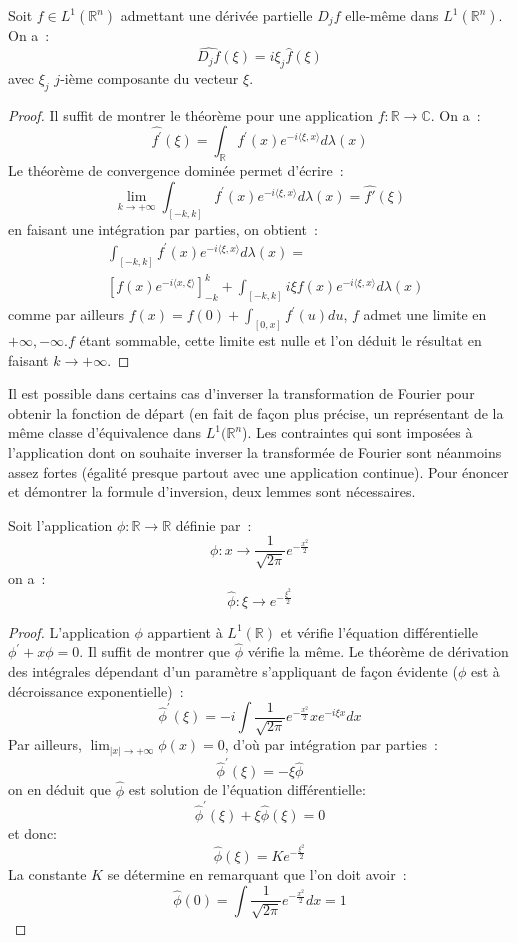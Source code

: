\begin{mandatory}
\begin{prop}
Soit $f \in L^1(\mathbb{R}^n)$ admettant une dérivée partielle $D_j f$
elle-même dans $ L^1(\mathbb{R}^n)$. On a~:
\[
\widehat{D_j f}(\xi) =  i \xi_j \widehat{f}(\xi)
\]
avec $\xi_j$ $j$-ième composante du vecteur $\xi$.
\end{prop}
\end{mandatory}
\begin{proof}
Il suffit de montrer le théorème pour une application $f : \mathbb{R}
\to \mathbb{C}$.
On a~:
\[
\widehat{f^\prime}(\xi) = \int_{\mathbb{R}} f^\prime (x) e^{-i \langle \xi,
  x \rangle } d \lambda(x)
\]
Le théorème de convergence dominée permet d'écrire~:
\[
\lim_{k \to + \infty} \int_{[-k,k]} f^\prime (x) e^{-i \langle \xi,
  x \rangle} d \lambda(x) = \widehat{f\prime}(\xi)
\]
en faisant une intégration par parties, on obtient~:
\begin{align*}
& \int_{[-k,k]} f^\prime(x) e^{-i \langle \xi,
  x \rangle } d \lambda(x) = \\
&[f(x) e^{-i \langle
  x, \xi \rangle }]_{-k}^k +  \int_{[-k,k]} i \xi f(x) e^{-i \langle\xi,
  x \rangle } d \lambda(x)
\end{align*}
comme par ailleurs $f(x) = f(0) +\int_{[0,x]} f^\prime(u) du$, $f$
admet une limite en $+\infty, -\infty$.$f$ étant sommable, cette
limite est nulle et l'on déduit le résultat en faisant $k \to +\infty$.
\end{proof}
Il est possible dans certains cas d'inverser la transformation de Fourier pour
obtenir la fonction de départ (en fait de façon plus précise, un représentant
de la même classe d'équivalence dans $L^1(\mathbb{R}^n$). Les contraintes qui
sont imposées à l'application dont on souhaite inverser la transformée de
Fourier sont néanmoins assez fortes (égalité presque partout avec une
application continue). Pour énoncer et démontrer la formule d'inversion, deux
lemmes sont nécessaires.
\begin{lemme}\label{fourier:3}
Soit l'application $\phi \colon \mathbb{R} \to \mathbb{R}$ définie par~:
\[
\phi : x \to \frac{1}{\sqrt{2\pi}}e^{-\frac{x^2}{2}}
\]
on a~:
\[
\widehat{\phi} : \xi \to e^{- \frac{\xi^2}{2}}
\]
\end{lemme}
\begin{proof}
L'application $\phi$ appartient à $L^1(\mathbb{R})$ et vérifie l'équation
différentielle $\phi^\prime + x \phi = 0$. Il suffit de montrer que $\widehat{\phi}$ vérifie la même.
Le théorème de dérivation des intégrales dépendant d'un paramètre
s'appliquant de façon évidente ($\phi$ est à décroissance
exponentielle)~:
\[
\widehat{\phi}^\prime(\xi) = -i \int
\frac{1}{\sqrt{2\pi}}e^{-\frac{x^2}{2}} x e^{-i \xi x} dx
\]
Par ailleurs, $\lim_{|x| \to +\infty} \phi(x) = 0$, d'où par intégration
par parties~:
\[
\widehat{\phi}^\prime(\xi) = - \xi \widehat{\phi}
\]
on en déduit que $\widehat{\phi}$ est solution de l'équation différentielle:
$$\widehat{\phi}^\prime(\xi)+\xi \widehat{\phi}(\xi)=0$$
 et donc:
\[
\widehat{\phi}(\xi) = K e^{-\frac{\xi^2}{2}}
\]
La constante $K$ se détermine en remarquant que l'on doit avoir~:
\[
\widehat{\phi}(0) = \int \frac{1}{\sqrt{2\pi}}e^{-\frac{x^2}{2}} dx = 1
\]
\end{proof}
